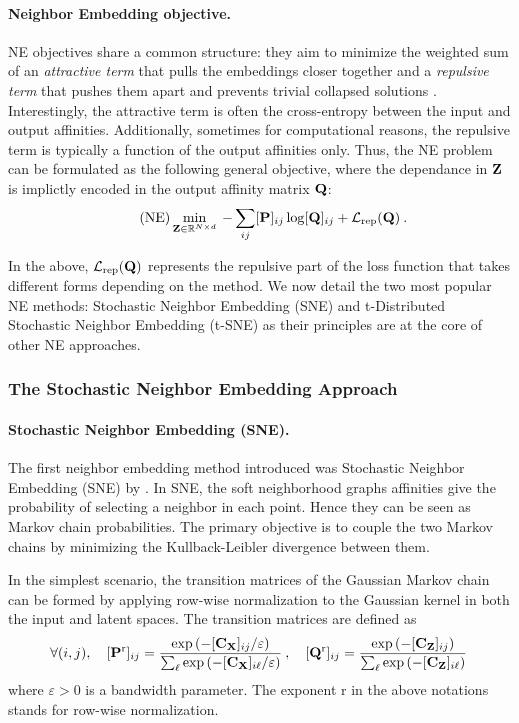 \paragraph{Neighbor Embedding objective.}
NE objectives share a common structure: they aim to minimize the weighted sum of an \emph{attractive term} that pulls the embeddings closer together and a \emph{repulsive term} that pushes them apart and prevents trivial collapsed solutions \citep{van2022probabilistic}. Interestingly, the attractive term is often the cross-entropy between the input and output affinities. Additionally, sometimes for computational reasons, the repulsive term is typically a function of the output affinities only. Thus, the NE problem can be formulated as the following general objective, where the dependance in ${\mathbf{Z}}$ is implictly encoded in the output affinity matrix ${\mathbf{Q}}$:
\begin{align}\tag{NE}\label{eq:ne_attraction_repulsion}
    \min_{{\mathbf{Z}} \in \mathbb{R}^{N \times d}} \: - \sum_{ij} [{\mathbf{P}}]_{ij} \log [{\mathbf{Q}}]_{ij} + \mathcal{L}_{\mathrm{rep}}({\mathbf{Q}}) \:.
\end{align}

In the above, \(\mathcal{L}_{\mathrm{rep}}({\mathbf{Q}})\) represents the repulsive part of the loss function that takes different forms depending on the method. We now detail the two most popular NE methods: Stochastic Neighbor Embedding (SNE) and t-Distributed Stochastic Neighbor Embedding (t-SNE) as their principles are at the core of other NE approaches.

\subsubsection{The Stochastic Neighbor Embedding Approach}\label{sec:sne}

\paragraph{Stochastic Neighbor Embedding (SNE).}The first neighbor embedding method introduced was Stochastic Neighbor Embedding (SNE) by \cite{hinton2002stochastic}. In SNE, the soft neighborhood graphs affinities give the probability of selecting a neighbor in each point. Hence they can be seen as Markov chain probabilities. The primary objective is to couple the two Markov chains by minimizing the Kullback-Leibler divergence between them. 

In the simplest scenario, the transition matrices of the Gaussian Markov chain can be formed by applying row-wise normalization to the Gaussian kernel in both the input and latent spaces. The transition matrices are defined as
\begin{align}
    \forall (i,j), \quad [{\mathbf{P}}^{\mathrm{r}}]_{ij} = \frac{\exp{(-[{\mathbf{C}}_{{\mathbf{X}}}]_{ij} / \varepsilon)}}{\sum_\ell \exp{(-[{\mathbf{C}}_{{\mathbf{X}}}]_{i\ell} / \varepsilon)} } \:, \quad [{\mathbf{Q}}^{\mathrm{r}}]_{ij} = \frac{\exp{(-[{\mathbf{C}}_{{\mathbf{Z}}}]_{ij})}}{\sum_\ell \exp{(-[{\mathbf{C}}_{{\mathbf{Z}}}]_{i\ell})}} \,
\end{align}
where $\varepsilon > 0$ is a bandwidth parameter. The exponent $\mathrm{r}$ in the above notations stands for row-wise normalization.


